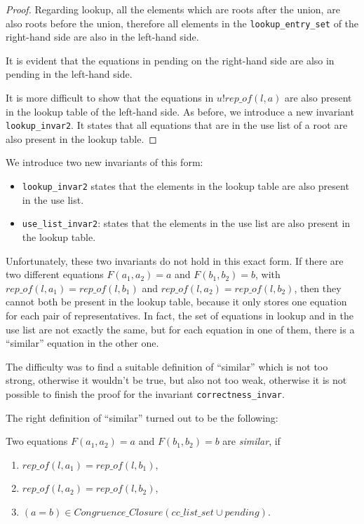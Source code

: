 \begin{proof}
Regarding lookup, all the elements which are roots after the union, are also roots before the union, therefore all elements in the \lstinline{lookup_entry_set} of the right-hand side are also in the left-hand side.

It is evident that the equations in pending on the right-hand side are also in pending in the left-hand side.

It is more difficult to show that the equations in $u ! rep\_of(l, a)$ are also present in the lookup table of the left-hand side. As before, we introduce a new invariant \lstinline{lookup_invar2}. It states that all equations that are in the use list of a root are also present in the lookup table.
\end{proof}

We introduce two new invariants of this form:
\begin{itemize}
    \item \lstinline{lookup_invar2} states that the elements in the lookup table are also present in the use list.
	\item \lstinline{use_list_invar2}: states that the elements in the use list are also present in the lookup table.
\end{itemize}

Unfortunately, these two invariants do not hold in this exact form. If there are two different equations $F(a_1,a_2) = a$ and $F(b_1, b_2) = b$, with $rep\_of(l, a_1) = rep\_of(l, b_1)$ and $rep\_of(l, a_2) = rep\_of(l, b_2)$, then they cannot both be present in the lookup table, because it only stores one equation for each pair of representatives. In fact, the set of equations in lookup and in the use list are not exactly the same, but for each equation in one of them, there is a ``similar'' equation in the other one.

The difficulty was to find a suitable definition of ``similar'' which is not too strong, otherwise it wouldn't be true, but also not too weak, otherwise it is not possible to finish the proof for the invariant \lstinline{correctness_invar}.

The right definition of ``similar'' turned out to be the following:

\begin{definition}
Two equations $F(a_1, a_2) = a$ and $F(b_1, b_2) = b$ are \emph{similar}, if
\begin{enumerate}[label=(\roman*)]
\itemsep0em
    \item $rep\_of(l, a_1) = rep\_of(l, b_1)$,
    \item $rep\_of(l, a_2) = rep\_of(l, b_2)$,
    \item $(a=b) \in Congruence\_Closure (cc\_list\_set \cup pending)$.
\end{enumerate}
\end{definition}

